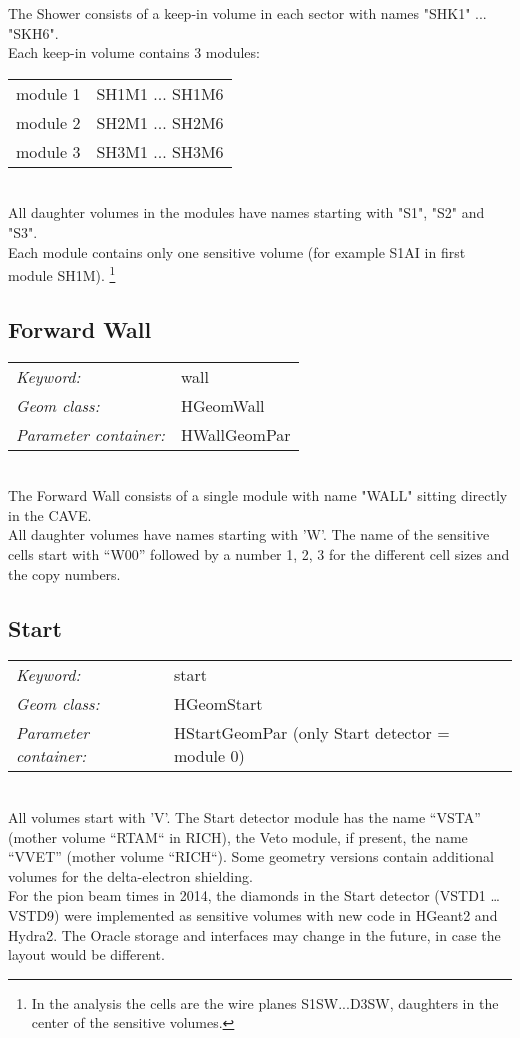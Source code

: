 The Shower consists of a keep-in volume in each sector with names "SHK1" ... "SKH6".\\
Each keep-in volume contains 3 modules:\\
\begin{tabular}{ll}
module 1 & SH1M1 ... SH1M6 \\
module 2 & SH2M1 ... SH2M6 \\
module 3 & SH3M1 ... SH3M6
\end{tabular}\\
All  daughter volumes in the modules have names starting with "S1", "S2" and "S3".\\
Each module contains only one sensitive volume (for example S1AI in first module SH1M).
\footnote{In the analysis the cells are the wire planes S1SW...D3SW, daughters in the center of the sensitive volumes.}

\subsection*{Forward Wall}

\begin{tabular}{ll}
\emph{Keyword:}             & wall \\
\emph{Geom class:}          & HGeomWall \\
\emph{Parameter container:} & HWallGeomPar 
\end{tabular}\\

The Forward Wall consists of a single module with name "WALL" sitting directly in the CAVE.\\
All daughter volumes have names starting with 'W'. The name of the sensitive cells start with ``W00'' followed by a number 
1, 2, 3 for the different cell sizes and the copy numbers.

\subsection*{Start}

\begin{tabular}{ll}
\emph{Keyword:}             & start \\
\emph{Geom class:}          & HGeomStart \\
\emph{Parameter container:} & HStartGeomPar (only Start detector = module 0)
\end{tabular}\\

All volumes start with 'V'. The Start detector module has the name ``VSTA'' (mother volume ``RTAM`` in RICH), 
the Veto module, if present, the name ``VVET'' (mother volume ``RICH``). Some geometry versions contain additional volumes
for the delta-electron shielding.\\
For the pion beam times in 2014, the diamonds in the Start detector (VSTD1 \ldots VSTD9) were implemented as 
sensitive volumes with new code in HGeant2 and Hydra2. The Oracle storage and interfaces may change in the future, in 
case the layout would be different.

